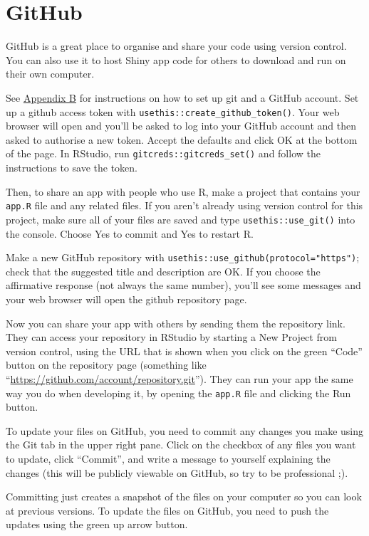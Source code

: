 \documentclass[
]{book}
\begin{document}
\hypertarget{github}{%
\section{GitHub}\label{github}}

GitHub is a great place to organise and share your code using version control. You can also use it to host Shiny app code for others to download and run on their own computer.

See \protect\hyperlink{setup-git}{Appendix B} for instructions on how to set up git and a GitHub account. Set up a github access token with \texttt{usethis::create\_github\_token()}. Your web browser will open and you'll be asked to log into your GitHub account and then asked to authorise a new token. Accept the defaults and click OK at the bottom of the page. In RStudio, run \texttt{gitcreds::gitcreds\_set()} and follow the instructions to save the token.

Then, to share an app with people who use R, make a project that contains your \texttt{app.R} file and any related files. If you aren't already using version control for this project, make sure all of your files are saved and type \texttt{usethis::use\_git()} into the console. Choose Yes to commit and Yes to restart R.

Make a new GitHub repository with \texttt{usethis::use\_github(protocol="https")}; check that the suggested title and description are OK. If you choose the affirmative response (not always the same number), you'll see some messages and your web browser will open the github repository page.

Now you can share your app with others by sending them the repository link. They can access your repository in RStudio by starting a New Project from version control, using the URL that is shown when you click on the green ``Code'' button on the repository page (something like ``\url{https://github.com/account/repository.git}''). They can run your app the same way you do when developing it, by opening the \texttt{app.R} file and clicking the Run button.

To update your files on GitHub, you need to commit any changes you make using the Git tab in the upper right pane. Click on the checkbox of any files you want to update, click ``Commit'', and write a message to yourself explaining the changes (this will be publicly viewable on GitHub, so try to be professional ;).

Committing just creates a snapshot of the files on your computer so you can look at previous versions. To update the files on GitHub, you need to push the updates using the green up arrow button.
\end{document}
